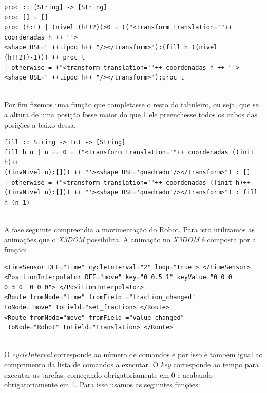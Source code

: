 \documentclass[a4paper,12pt,portuges]{article}
\begin{document}
\begin{verbatim}
proc :: [String] -> [String]
proc [] = []
proc (h:t) | (nivel (h!!2))>0 = (("<transform translation='"++ coordenadas h ++ "'>
<shape USE=" ++tipoq h++ "/></transform>"):(fill h ((nivel (h!!2))-1))) ++ proc t
| otherwise = ("<transform translation='"++ coordenadas h ++ "'>
<shape USE=" ++tipoq h++ "/></transform>"):proc t
\end{verbatim}
\\
Por fim fizemos uma função que completasse o resto do tabuleiro, ou seja, que se a altura de uma posição fosse maior do que 1 ele preenchesse todos os cubos das posições a baixo dessa.
\\
\begin{verbatim}
fill :: String -> Int -> [String]
fill h n | n == 0 = ("<transform translation='"++ coordenadas ((init h)++ 
((invNivel n):[])) ++ "'><shape USE='quadrado'/></transform>") : []
| otherwise = ("<transform translation='"++ coordenadas ((init h)++ 
((invNivel n):[])) ++ "'><shape USE='quadrado'/></transform>") : fill h (n-1)
\end{verbatim}
\\

A fase seguinte compreendia a movimentação do Robot. Para isto utilizamos as animações que o \textit{X3DOM} possibilita. A animação no \textit{X3DOM}  é composta por a função:
\\
\begin{verbatim}
<timeSensor DEF="time" cycleInterval="2" loop="true"> </timeSensor>
<PositionInterpolator DEF="move" key="0 0.5 1" keyValue="0 0 0  
0 3 0  0 0 0"> </PositionInterpolator>
<Route fromNode="time" fromField ="fraction_changed" 
toNode="move" toField="set_fraction> </Route> 
<Route fromNode="move" fromField ="value_changed"
 toNode="Robot" toField="translation> </Route>    
\end{verbatim}
\\

O \textit{cycleInterval} corresponde ao número de comandos e por isso é também igual ao comprimento da lista de comandos a executar. O \textit{key} corresponde ao tempo para executar as tarefas, começando obrigatoriamente em 0 e acabando obrigatoriamente em 1. Para isso usamos as seguintes funções:\\
\end{document}
